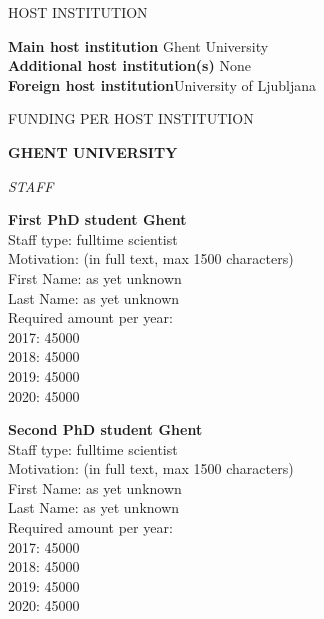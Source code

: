 \documentclass[11pt,dvipsnames,usenames,a4paper]{article}
\begin{document}
\vspace{10pt}

\begin{shaded}\centering HOST INSTITUTION \end{shaded}
\textbf{Main host institution} \tab Ghent University \\
\textbf{Additional host institution(s)} \tab None\\
\textbf{Foreign host institution}\tab University of Ljubljana \\

\begin{shaded}\centering FUNDING PER HOST INSTITUTION \end{shaded}










{\bf GHENT UNIVERSITY}

{\it STAFF}

{\bf First PhD student Ghent}\\
Staff type: fulltime scientist\\
Motivation: (in full text, max 1500 characters)\\
First Name: as yet unknown\\
Last Name: as yet unknown\\
Required amount per year:\\
2017: 45000\\
2018: 45000\\
2019: 45000\\
2020: 45000


{\bf Second PhD student Ghent}\\
Staff type: fulltime scientist\\
Motivation: (in full text, max 1500 characters)\\
First Name: as yet unknown\\
Last Name: as yet unknown\\
Required amount per year:\\
2017: 45000\\
2018: 45000\\
2019: 45000\\
2020: 45000
\end{document}
